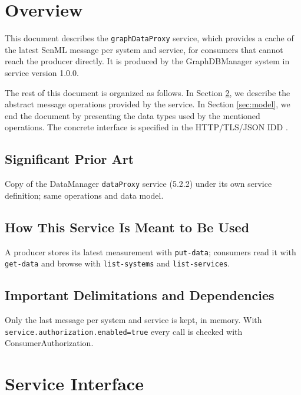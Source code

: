 \documentclass[a4paper]{arrowhead}
\begin{document}
\section{Overview}
\label{sec:overview}

This document describes the \texttt{graphDataProxy} service, which provides a cache of the latest SenML message per system and service, for consumers that cannot reach the producer directly.
It is produced by the GraphDBManager system \cite{gdm-sysd} in service version 1.0.0.

The rest of this document is organized as follows.
In Section \ref{sec:operations}, we describe the abstract message operations provided by the service.
In Section \ref{sec:model}, we end the document by presenting the data types used by the mentioned operations.
The concrete interface is specified in the HTTP/TLS/JSON IDD \cite{gdm-graphDataProxy-http-idd}.

\subsection{Significant Prior Art}

Copy of the DataManager \texttt{dataProxy} service (5.2.2) under its own service definition; same operations and data model.

\subsection{How This Service Is Meant to Be Used}

A producer stores its latest measurement with \texttt{put-\allowbreak{}data}; consumers read it with \texttt{get-\allowbreak{}data} and browse with \texttt{list-\allowbreak{}systems} and \texttt{list-\allowbreak{}services}.

\subsection{Important Delimitations and Dependencies}
\label{sec:delimitations}

Only the last message per system and service is kept, in memory. With \texttt{service.\allowbreak{}authorization.\allowbreak{}enabled=\allowbreak{}true} every call is checked with Consumer\allowbreak{}Authorization.

\newpage

\section{Service Interface}
\label{sec:operations}
\end{document}

